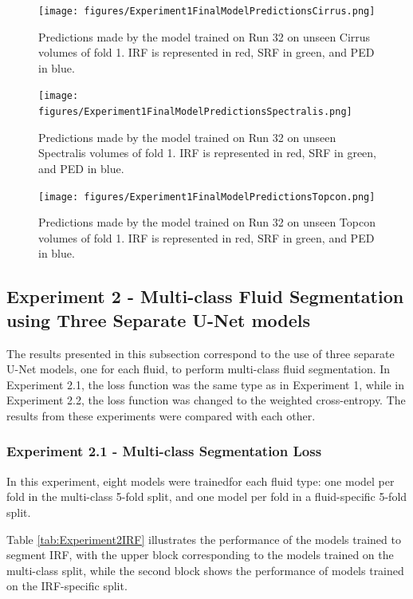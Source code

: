 \begin{figure}[!ht]
	\centering
	\texttt{[image: figures/Experiment1FinalModelPredictionsCirrus.png]}
	\caption{Predictions made by the model trained on Run 32 on unseen Cirrus volumes of fold 1. IRF is represented in red, SRF in green, and PED in blue.}
	\label{fig:Experiment1FinalModelPredictionsCirrus}
\end{figure}

\begin{figure}[!ht]
	\centering
	\texttt{[image: figures/Experiment1FinalModelPredictionsSpectralis.png]}
	\caption{Predictions made by the model trained on Run 32 on unseen Spectralis volumes of fold 1. IRF is represented in red, SRF in green, and PED in blue.}
	\label{fig:Experiment1FinalModelPredictionsSpectralis}
\end{figure}

\begin{figure}[!ht]
	\centering
	\texttt{[image: figures/Experiment1FinalModelPredictionsTopcon.png]}
	\caption{Predictions made by the model trained on Run 32 on unseen Topcon volumes of fold 1. IRF is represented in red, SRF in green, and PED in blue.}
	\label{fig:Experiment1FinalModelPredictionsTopcon}
\end{figure}

\subsection{Experiment 2 - Multi-class Fluid Segmentation using Three Separate U-Net models}
The results presented in this subsection correspond to the use of three separate U-Net models, one for each fluid, to perform multi-class fluid segmentation. In Experiment 2.1, the loss function was the same type as in Experiment 1, while in Experiment 2.2, the loss function was changed to the weighted cross-entropy. The results from these experiments were compared with each other.

\subsubsection{Experiment 2.1 - Multi-class Segmentation Loss}
In this experiment, eight models were trainedfor each fluid type: one model per fold in the multi-class 5-fold split, and one model per fold in a fluid-specific 5-fold split.
\par
Table \ref{tab:Experiment2IRF} illustrates the performance of the models trained to segment IRF, with the upper block corresponding to the models trained on the multi-class split, while the second block shows the performance of models trained on the IRF-specific split.

